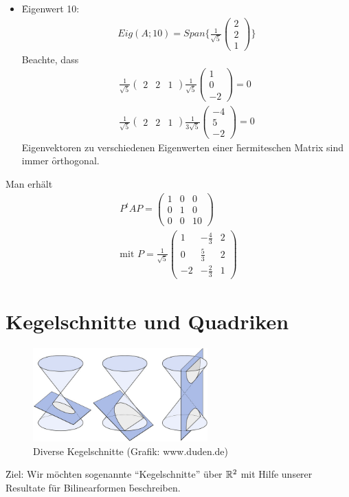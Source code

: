 \begin{itemize}
\item \f{Eigenwert 10}: 
\begin{align}
Eig(A; 10) = Span \{\frac{1}{\sqrt{5}}\begin{pmatrix} 2 \\ 2 \\ 1 \end{pmatrix} \}
\end{align}
Beachte, dass
\begin{align}
\frac{1}{\sqrt{5}} \begin{pmatrix} 2 & 2 & 1 \end{pmatrix} \frac{1}{\sqrt{5}} \begin{pmatrix} 1 \\ 0 \\ -2 \end{pmatrix} = 0 \\
\frac{1}{\sqrt{5}} \begin{pmatrix} 2 & 2 & 1 \end{pmatrix} \frac{1}{3\sqrt{5}} \begin{pmatrix} -4 \\ 5 \\ -2 \end{pmatrix} = 0 
\end{align}
Eigenvektoren zu verschiedenen Eigenwerten einer \f{hermiteschen} Matrix sind immer \f{orthogonal}.
\end{itemize}
Man erhält
\begin{align}
P^{t} A P = \begin{pmatrix} 1 & 0 & 0 \\ 0 & 1 & 0 \\ 0 & 0 & 10 \end{pmatrix} \\
\text{mit } P = \frac{1}{\sqrt{5}} \begin{pmatrix} 1 & -\frac{4}{3} & 2 \\ 0 & \frac{5}{3} & 2 \\ -2 & -\frac{2}{3} & 1\end{pmatrix}
\end{align}

\section{Kegelschnitte und Quadriken}
\begin{figure}[h!]
\centering
\includegraphics[width=0.6\textwidth]{img/Kegelschnitt.jpg}
\caption{Diverse Kegelschnitte (Grafik: www.duden.de) }
\end{figure} 
\noindent \f{Ziel}: Wir möchten sogenannte ``Kegelschnitte'' über $\mathbb{R}^2$ mit Hilfe unserer Resultate für Bilinearformen \f{beschreiben}.

